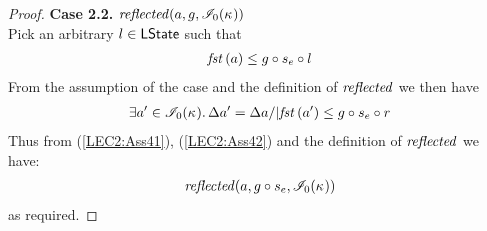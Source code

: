 \begin{lemma}
\begin{proof}
\noindent\textbf{Case 2.2.} $	\mathit{reflected}(a, g, \mathscr{I}_0(\kappa_{}))$\\
Pick an arbitrary $l \in \textsf{LState}$ such that 
%
\begin{align}
	\mathit{fst}\left(a\right) \leq g \circ s_e \circ l \label{LEC2:Ass41}
\end{align} 
%
From the assumption of the case and the definition of $\mathit{reflected}$ we then have
%
\begin{align}
	\exists a' \in \mathscr{I}_0(\kappa_{}).\, \Delta {a'} = \Delta {a} /| \mathit{fst}\left(a'\right) \leq g \circ s_e \circ r \label{LEC2:Ass42}
\end{align}
%
Thus from (\ref{LEC2:Ass41}), (\ref{LEC2:Ass42}) and the definition of $\mathit{reflected}$ we have:
%
\begin{align*}
	\mathit{reflected}(a, g \circ s_e, \mathscr{I}_0(\kappa_{}))
\end{align*}
%
as required.
%
\end{proof}
\end{lemma}
